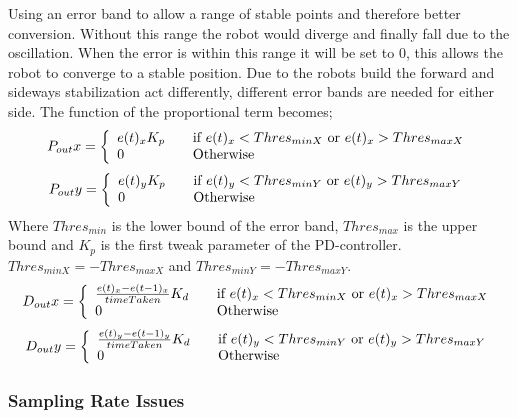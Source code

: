 \documentclass[a4paper]{article}
\begin{document}
Using an error band to allow a range of stable points and therefore better
conversion. Without this range the robot would diverge and finally fall due to
the oscillation. When the error is within this range it will be set to 0, this
allows the robot to converge to a stable position. Due to the robots build the
forward and sideways stabilization act differently, different error bands are
needed for either side. The function of the proportional term becomes;
\[
  P_{out}x = \left\{ 
  \begin{array}{l l}
     e(t)_xK_p& \quad \text{if $e(t)_x < Thres_{min X}$ or $e(t)_x > Thres_{max X}$}\\ 
     0& \quad \text{Otherwise}\\
  \end{array} \right.
\]
\[
  P_{out}y = \left\{ 
  \begin{array}{l l}
      e(t)_yK_p& \quad \text{if $e(t)_y < Thres_{min Y}$ or $e(t)_y > Thres_{max Y}$}\\ 
     0& \quad \text{Otherwise}\\
  \end{array} \right.
\]
Where $Thres_{min}$ is the lower bound of the error band, $Thres_{max}$ is the upper bound
and $K_p$ is the  first tweak parameter of the PD-controller.\\
$Thres_{min X} = -Thres_{max X}$ and
$Thres_{min Y} = -Thres_{max Y}$.
\[
  D_{out}x = \left\{ 
  \begin{array}{l l}
      \frac{e(t)_x - e(t-1)_x}{timeTaken}K_d& \quad \text{if $e(t)_x < Thres_{min X}$  or $e(t)_x > Thres_{max X}$}\\ 
     0& \quad \text{Otherwise}\\
  \end{array} \right.
\]
\[
  D_{out}y = \left\{ 
  \begin{array}{l l}
     \frac{ e(t)_y - e(t-1)_y}{timeTaken}K_d& \quad \text{if $e(t)_y < Thres_{min Y}$ or $e(t)_y > Thres_{max Y}$}\\ 
     0& \quad \text{Otherwise}\\
  \end{array} \right.
\]

\subsubsection{Sampling Rate Issues}
\end{document}
